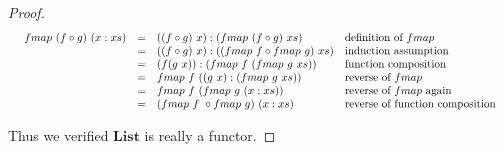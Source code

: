 \documentclass[b5paper]{article}
\begin{document}
\begin{example}
\begin{mdframed}
\begin{proof}
\[
\resizebox{\textwidth}{!}{\ensuremath{
\begin{array}{rcll}
fmap\ (f \circ g)\ (x:xs) & = & ((f \circ g)\ x):(fmap\ (f \circ g)\ xs) & \text{definition of $fmap$} \\
  & = & ((f \circ g)\ x):((fmap\ f \circ fmap\ g)\ xs) & \text{induction assumption} \\
  & = & (f(g\ x)):(fmap\ f\ (fmap\ g\ xs)) & \text{function composition} \\
  & = & fmap\ f\ ((g\ x):(fmap\ g\ xs)) & \text{reverse of $fmap$} \\
  & = & fmap\ f\ (fmap\ g\ (x:xs)) & \text{reverse of $fmap$ again} \\
  & = & (fmap\ f\ \circ fmap\ g)\ (x:xs) & \text{reverse of function composition}
\end{array}
}}
\]

Thus we verified $\mathbf{List}$ is really a functor.
\end{proof}
\end{mdframed}
\end{example}

\begin{Exercise}\label{ex:functor}
\end{Exercise}
\end{document}
